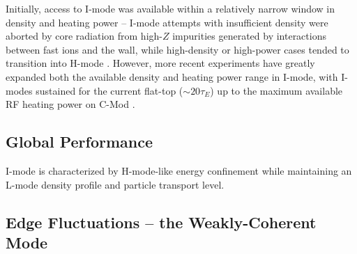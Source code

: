 Initially, access to I-mode was available within a relatively narrow window in density and heating power -- I-mode attempts with insufficient density were aborted by core radiation from high-$Z$ impurities generated by interactions between fast ions and the wall, while high-density or high-power cases tended to transition into H-mode \cite{Whyte2010}.  However, more recent experiments have greatly expanded both the available density and heating power range in I-mode, with I-modes sustained for the current flat-top ($\sim 20\tau_E$) up to the maximum available RF heating power on C-Mod \cite{Hubbard2012,Hubbard2012b}.

\subsection{Global Performance}\label{subsec:hcr_imode_performance}

I-mode is characterized by H-mode-like energy confinement while maintaining an L-mode density profile and particle transport level.

\subsection{Edge Fluctuations -- the Weakly-Coherent Mode}\label{subsec:hcr_imode_wcm}








\nicechapterending


